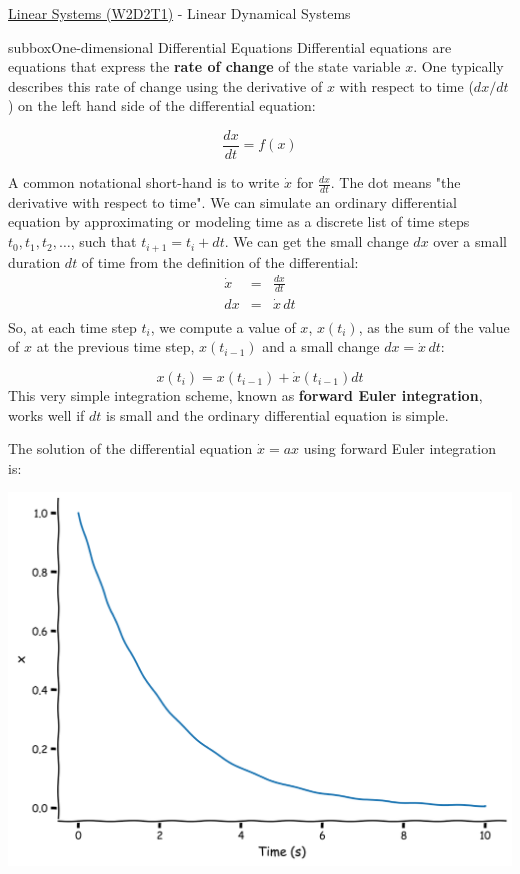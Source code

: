 \begin{textbox}{\href{https://compneuro.neuromatch.io/tutorials/W2D2_LinearSystems/student/W2D2_Tutorial1.html}{Linear Systems (W2D2T1)} -  Linear Dynamical Systems}
\begin{subbox}{subbox}{One-dimensional Differential Equations}
\scriptsize
Differential equations are equations that express the \textbf{rate of change} of the state variable $x$. One typically describes this rate of change using the derivative of $x$ with respect to time ($dx/dt$) on the left hand side of the differential equation:

$$\frac{dx}{dt} = f(x)$$

A common notational short-hand is to write $\dot{x}$ for $\frac{dx}{dt}$. The dot means "the derivative with respect to time".
We can simulate an ordinary differential equation by approximating or modeling time as a discrete list of time steps $t_0, t_1, t_2, \dots$, such that $t_{i+1}=t_i+dt$. We can get the small change $dx$ over a small duration $dt$ of time from the definition of the differential:
\begin{eqnarray}
  \dot x &=& \frac{dx}{dt} \\
  dx     &=& \dot x\, dt  \\
\end{eqnarray}
So, at each time step $t_i$, we compute a value of $x$, $x(t_i)$, as the sum of the value of $x$ at the previous time step, $x(t_{i-1})$ and a small change $dx=\dot x\,dt$:

$$x(t_i)=x(t_{i-1})+\dot x(t_{i-1}) dt$$
This very simple integration scheme, known as \textbf{forward Euler integration}, works well if $dt$ is small and the ordinary differential equation is simple.

The solution of the differential equation $\dot{x} = a x$ using forward Euler integration is: 

\centering
\includegraphics[scale=0.15]{Figures/LS/LSFigure1.png}
\end{subbox}
\end{textbox}
